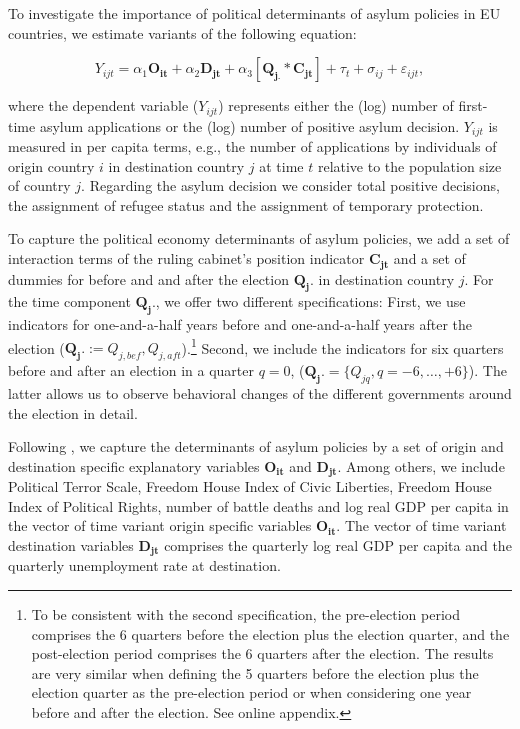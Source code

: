 \documentclass[a4paper,12pt]{article}
\begin{document}
To investigate the importance of political determinants of asylum policies in EU countries, we estimate variants of the following equation:

\begin{equation}
Y_{ijt} =\alpha_1 \mathbf{O_{it}} + \alpha_2 \mathbf{D_{jt}} + \alpha_3 [\mathbf{Q_{j.}} *  \mathbf{C_{jt}}] + \tau_t + \sigma_{ij} +  \varepsilon_{ijt},
\end{equation}

where the dependent variable ($Y_{ijt}$) represents either the (log) number of first-time asylum applications or the (log) number of positive asylum decision. $Y_{ijt}$ is measured in per capita terms, e.g., the number of applications by individuals of origin country $i$ in destination country $j$ at time $t$ relative to the population size of country $j$. Regarding the asylum decision we consider total positive decisions, the assignment of refugee status and the assignment of temporary protection. 

To capture the political economy determinants of asylum policies, we add a set of interaction terms of the ruling cabinet's position indicator $\mathbf{C_{jt}}$ and  a set of dummies for before and and after the election $\mathbf{Q_j.}$ in destination country $j$. For the time component $\mathbf{Q_j.}$, we offer two different specifications: First, we use indicators for one-and-a-half years before and one-and-a-half years after the election ($\mathbf{Q_j.} := Q_{j,bef},  Q_{j,aft}$).\footnote{To be consistent with the second specification, the pre-election period comprises the 6 quarters before the election plus the election quarter, and the post-election period comprises the 6 quarters after the election. The results are very similar when defining the 5 quarters before the election plus the election quarter as the pre-election period or when considering one year before and after the election. See online appendix.} Second, we include the indicators for six quarters before and after an election in a quarter $q=0$, ($\mathbf{Q_j.} =\{Q_{jq}, q = -6, \ldots, +6\}$). The latter allows us to observe behavioral changes of the different governments around the election in detail.

Following \cite{hatton2016}, we capture the determinants of asylum policies by a set of origin and destination specific explanatory variables $\mathbf{O_{it}}$ and $\mathbf{D_{jt}}$. Among others, we include Political Terror Scale, Freedom House Index of Civic Liberties, Freedom House Index of  Political Rights, number of battle deaths and log real GDP per capita in the vector of time variant origin specific variables $\mathbf{O_{it}}$. The vector of time variant destination variables $\mathbf{D_{jt}}$ comprises the quarterly log real GDP per capita and the quarterly unemployment rate at destination. 
 
\end{document}
